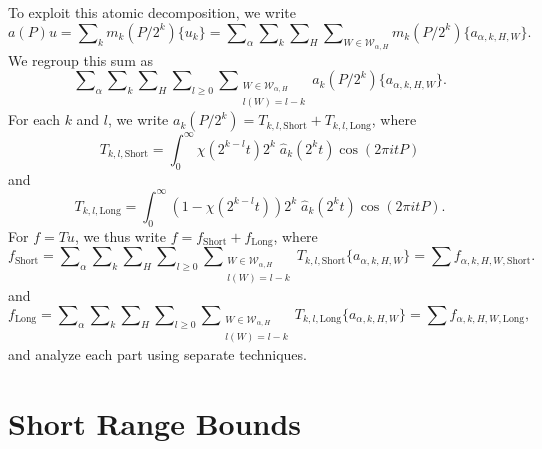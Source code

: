 To exploit this atomic decomposition, we write
%
\[ a(P) u = \sum\nolimits_k m_k(P/2^k) \{ u_k \} = \sum\nolimits_\alpha \sum\nolimits_k \sum\nolimits_H \sum\nolimits_{W \in \mathcal{W}_{\alpha,H}} m_k(P/2^k) \{ a_{\alpha,k,H,W} \}. \]
%
We regroup this sum as
%
\[ \sum\nolimits_\alpha \sum\nolimits_k \sum\nolimits_H \sum\nolimits_{l \geq 0} \sum\nolimits_{\substack{W \in \mathcal{W}_{\alpha,H}\\l(W) = l - k}} a_k(P/2^k) \{ a_{\alpha,k,H,W} \}. \]
%
For each $k$ and $l$, we write $a_k(P/2^k) = T_{k,l,\text{Short}} + T_{k,l,\text{Long}}$, where
%
\[ T_{k,l,\text{Short}} = \int_0^\infty \chi( 2^{k-l} t ) 2^k\;\! \widehat{a}_k(2^k t) \cos(2 \pi i t P) \]
%
and
%
\[ T_{k,l,\text{Long}} = \int_0^\infty (1 - \chi(2^{k-l} t )) 2^k\;\! \widehat{a}_k(2^k t) \cos(2 \pi i t P).  \]
%
For $f = Tu$, we thus write $f = f_{\text{Short}} + f_{\text{Long}}$, where
%
\[ f_{\text{Short}} = \sum\nolimits_\alpha \sum\nolimits_k \sum\nolimits_H \sum\nolimits_{l \geq 0} \sum\nolimits_{\substack{W \in \mathcal{W}_{\alpha,H}\\l(W) = l - k}} T_{k,l,\text{Short}} \{ a_{\alpha,k,H,W} \} = \sum f_{\alpha,k,H,W,\text{Short}}. \]
%
and
%
\[ f_{\text{Long}} = \sum\nolimits_\alpha \sum\nolimits_k \sum\nolimits_H \sum\nolimits_{l \geq 0} \sum\nolimits_{\substack{W \in \mathcal{W}_{\alpha,H}\\l(W) = l - k}} T_{k,l,\text{Long}} \{ a_{\alpha,k,H,W} \} = \sum f_{\alpha,k,H,W,\text{Long}}, \]
%
and analyze each part using separate techniques.

\section{Short Range Bounds}

